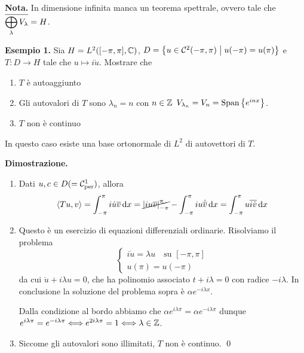 \textbf{Nota.} In dimensione infinita manca un teorema spettrale, ovvero tale che $\displaystyle \overline{\bigoplus_\lambda V_\lambda} = H$.


\textbf{Esempio 1.} Sia $H = L^2([-\pi,\pi],\mathbb C)$, $D = \left\{ u \in \mathcal{C}^2 (-\pi,\pi) \;\middle|\; u(-\pi) = u(\pi) \right\}$ e $T \colon D \to H$ tale che $u \mapsto i\dot u$.
Mostrare che
\begin{enumerate}

	\item $T$ è autoaggiunto

	\item Gli autovalori di $T$ sono $\lambda_n = n$ con $n \in \mathbb Z$ $V_{\lambda_n} = V_n = \operatorname{Span} \left\{ e^{inx} \right\}$.

	\item $T$ non è continuo

\end{enumerate}


In questo caso esiste una base ortonormale di $L^2$ di autovettori di $T$.

\textbf{Dimostrazione.} 
\begin{enumerate}

	\item Dati $u,c \in D (= \mathcal{C}_{\operatorname{per}}^1)$, allora
	$$
		\left<Tu,v \right> = \int_{-\pi}^\pi i \dot u \overline{v} \,\mathrm{d} x
		= \cancel{\left| iu\overline{v} \right|_{-\pi}^\pi} - \int_{-\pi}^\pi iu \dot{\overline{v}} \,\mathrm{d} x
		= \int_{-\pi}^\pi u \overline{i\dot v} \,\mathrm{d} x
	$$

	\item Questo è un esercizio di equazioni differenziali ordinarie. Risolviamo il problema
	$$
	\begin{cases}
		i\dot u = \lambda u \quad \text{su } [-\pi,\pi] \\
		u(\pi) = u(-\pi)
	\end{cases} 
	$$
	da cui $\dot u + i \lambda u = 0$, che ha polinomio associato $t + i\lambda = 0$ con radice  $-i\lambda$. In conclusione la soluzione del problema sopra è $\alpha e^{-i\lambda x}$.

	Dalla condizione al bordo abbiamo che $\alpha e^{i\lambda \pi} = \alpha e^{-i\lambda \pi}$ dunque $e^{i\lambda \pi} = e^{- i\lambda \pi} \Longleftrightarrow e^{2i\lambda \pi} = 1 \Longleftrightarrow \lambda \in \mathbb Z$.


	\item Siccome gli autovalori sono illimitati, $T$ non è continuo.
\qed

\end{enumerate}


